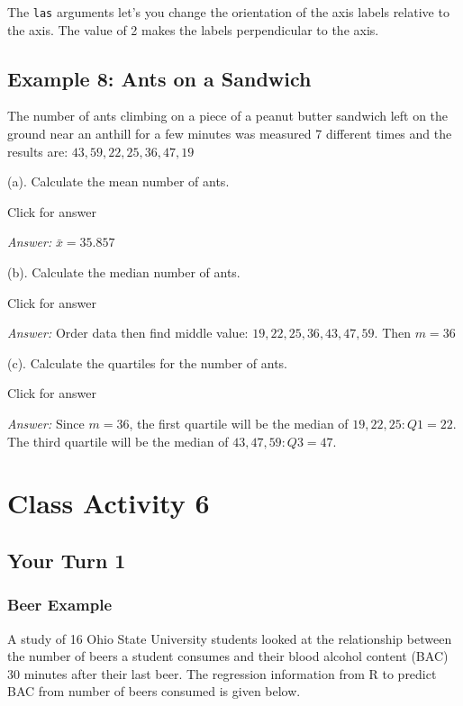 \documentclass[
]{book}
\begin{document}
The \texttt{las} arguments let's you change the orientation of the axis labels relative to the axis. The value of 2 makes the labels perpendicular to the axis.

\hypertarget{example-8-ants-on-a-sandwich}{%
\section{Example 8: Ants on a Sandwich}\label{example-8-ants-on-a-sandwich}}

The number of ants climbing on a piece of a peanut butter sandwich left on the ground near an anthill for a few minutes was measured 7 different times and the results are:
\(43, 59, 22, 25, 36, 47, 19\)

(a). Calculate the mean number of ants.

Click for answer

\emph{Answer:} \(\bar{x} = 35.857\)

(b). Calculate the median number of ants.

Click for answer

\emph{Answer:} Order data then find middle value: \(19, 22, 25, 36, 43, 47, 59\). Then \(m = 36\)

(c). Calculate the quartiles for the number of ants.

Click for answer

\emph{Answer:} Since \(m = 36\), the first quartile will be the median of \(19, 22, 25: Q1 = 22.\) The third quartile will be the median of \(43, 47, 59: Q3 = 47.\)

\hypertarget{class-activity-6}{%
\chapter{Class Activity 6}\label{class-activity-6}}

\hypertarget{your-turn-1-4}{%
\section{Your Turn 1}\label{your-turn-1-4}}

\hypertarget{beer-example}{%
\subsection{Beer Example}\label{beer-example}}

A study of 16 Ohio State University students looked at the relationship between the number of beers a student consumes and their blood alcohol content (BAC) 30 minutes after their last beer. The regression information from R to predict BAC from number of beers consumed is given below.
\end{document}
